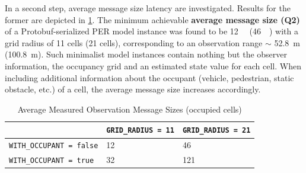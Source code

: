 In a second step, average message size latency are investigated. Results for the former are depicted in \cref{tab:performance_evaluation:message_sizes}. The minimum achievable \textbf{average message size (Q2)} of a Protobuf-serialized PER model instance was found to be \SI{12}{\kilo\byte} (\SI{46}{\kilo\byte}) with a grid radius of 11 cells (21 cells), corresponding to an observation range $\sim$ \SI{52.8}{\meter} (\SI{100.8}{\meter}). Such minimalist model instances contain nothing but the observer information, the occupancy grid and an estimated state value for each cell. When including additional information about the occupant (vehicle, pedestrian, static obstacle, etc.) of a cell, the average message size increases accordingly.

\begin{table}
	\centering
	\begin{tabular}{|p{6.2cm}|p{3.5cm}|p{3.5cm}|}
		\hline 
		& \texttt{GRID\_RADIUS = 11} & \texttt{GRID\_RADIUS = 21} \\ 
		\hline 
		\texttt{WITH\_OCCUPANT = false} & \SI{12}{\kilo\byte} & \SI{46}{\kilo\byte} \\ 
		\hline 
		\texttt{WITH\_OCCUPANT = true} & \SI{32}{\kilo\byte} & 1\SI{21}{\kilo\byte} \\ 
		\hline 
	\end{tabular}
	\caption[Average Measured Observation Message Sizes]{Average  Measured Observation Message Sizes (occupied cells)}
	\label{tab:performance_evaluation:message_sizes}
\end{table}
\par
\bigskip

